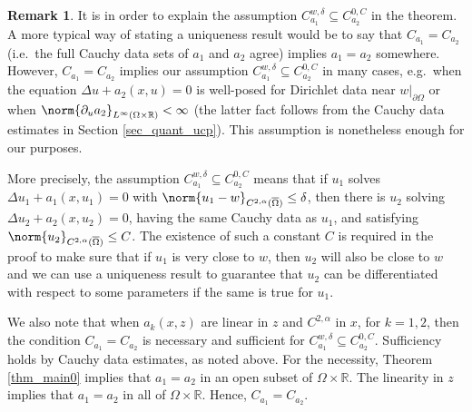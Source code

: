 \documentclass[11pt,a4paper]{amsart}
\theoremstyle{definition}
\newtheorem{Remark}[Theorem]{Remark}
\numberwithin{equation}{section}
\newcommand{\mR}{\mathbb{R}}                    %
\newcommand{\ol}[1]{\overline{#1}}
\newcommand{\p}{\partial}
\newcommand{\Om}{\Omega}
\begin{document}
\begin{Remark}
It is in order to explain the assumption $C_{a_1}^{w,\delta} \subseteq C_{a_2}^{0,C}$ in the theorem. A more typical way of stating a uniqueness result would be to say that $C_{a_1} = C_{a_2}$ (i.e.\ the full Cauchy data sets of $a_1$ and $a_2$ agree) implies $a_1 = a_2$ somewhere. However, $C_{a_1} = C_{a_2}$ implies our assumption $C_{a_1}^{w,\delta} \subseteq C_{a_2}^{0,C}$ in many cases, e.g.\ when the equation $\Delta u + a_2(x,u) = 0$ is well-posed for Dirichlet data near $w|_{\p \Omega}$ or when $\norm{\p_u a_2}_{L^{\infty}(\Omega \times \mR)} < \infty$ (the latter fact follows from the Cauchy data estimates in Section \ref{sec_quant_ucp}). This assumption is nonetheless enough for our purposes.

More precisely, the assumption $C_{a_1}^{w,\delta} \subseteq C_{a_2}^{0,C}$  means that if $u_1$ solves $\Delta u_1 + a_1(x,u_1) = 0$ with $\norm{u_1-w}_{C^{2,\alpha}(\ol{\Om})} \leq \delta$, then there is $u_2$ solving $\Delta u_2 + a_2(x,u_2) = 0$, having the same Cauchy data as $u_1$, and satisfying $\norm{u_2}_{C^{2,\alpha}(\ol{\Om})} \leq C$. The existence of such a constant $C$ is required in the proof to make sure that if $u_1$ is very close to $w$, then $u_2$ will also be close to $w$ and we can use a uniqueness result to guarantee that $u_2$ can be differentiated with respect to some parameters if the same is true for $u_1$.

We also note that when \( a_{k}(x,z) \) are linear in \( z \) and \( C^{2,\alpha} \) in \( x \), for \( k=1,2 \), then the condition \( C_{a_{1}} =  C_{a_{2}} \) is necessary and sufficient for \( C_{a_{1}}^{w,\delta}\subseteq C_{a_{2}}^{0,C} \). Sufficiency holds by Cauchy data estimates, as noted above. For the necessity, Theorem \ref{thm_main0} implies that \( a_{1} = a_{2} \) in an open subset of \( \Omega\times \mathbb{R} \). The linearity in \( z \) implies that \( a_{1} = a_{2} \) in all of \( \Omega\times\mathbb{R} \). Hence, \( C_{a_{1}} = C_{a_{2}} \).

\end{Remark}
\end{document}
